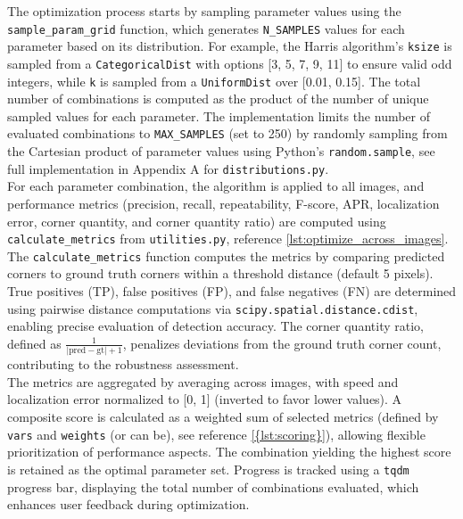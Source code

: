\documentclass[journal]{IEEEtran}
\begin{document}
The optimization process starts by sampling parameter values using the \texttt{sample\_param\_grid} function, which generates \texttt{N\_SAMPLES} values for each parameter based on its distribution. For example, the Harris algorithm’s \texttt{ksize} is sampled from a \texttt{CategoricalDist} with options [3, 5, 7, 9, 11] to ensure valid odd integers, while \texttt{k} is sampled from a \texttt{UniformDist} over [0.01, 0.15]. The total number of combinations is computed as the product of the number of unique sampled values for each parameter. The implementation limits the number of evaluated combinations to \texttt{MAX\_SAMPLES} (set to 250) by randomly sampling from the Cartesian product of parameter values using Python's \texttt{random.sample}, see full implementation in Appendix A for \texttt{distributions.py}.\\

For each parameter combination, the algorithm is applied to all images, and performance metrics (precision, recall, repeatability, F-score, APR, localization error, corner quantity, and corner quantity ratio) are computed using \texttt{calculate\_metrics} from \texttt{utilities.py}, reference \cref{lst:optimize_across_images}. The \texttt{calculate\_metrics} function computes the metrics by comparing predicted corners to ground truth corners within a threshold distance (default 5 pixels). True positives (TP), false positives (FP), and false negatives (FN) are determined using pairwise distance computations via \texttt{scipy.spatial.distance.cdist}, enabling precise evaluation of detection accuracy. The corner quantity ratio, defined as \( \frac{1}{|\text{pred} - \text{gt}| + 1} \), penalizes deviations from the ground truth corner count, contributing to the robustness assessment.\\

The metrics are aggregated by averaging across images, with speed and localization error normalized to [0, 1] (inverted to favor lower values). A composite score is calculated as a weighted sum of selected metrics (defined by \texttt{vars} and \texttt{weights} (or can be), see reference \cref{{lst:scoring}}), allowing flexible prioritization of performance aspects. The combination yielding the highest score is retained as the optimal parameter set. Progress is tracked using a \texttt{tqdm} progress bar, displaying the total number of combinations evaluated, which enhances user feedback during optimization.\\
\end{document}
